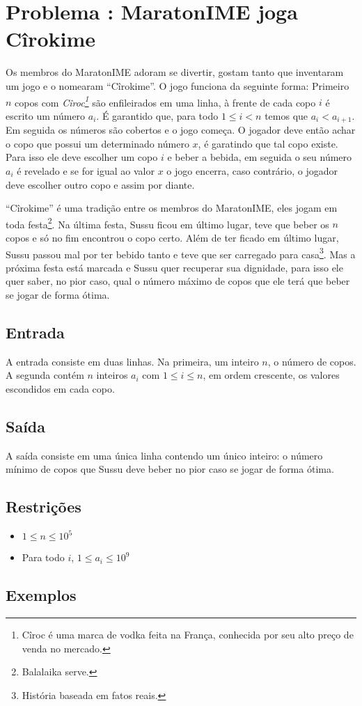 \section*{Problema \proxLetra: MaratonIME joga Cîrokime}

Os membros do MaratonIME adoram se divertir, gostam tanto que inventaram um jogo e o nomearam ``Cîrokime''. O jogo funciona da seguinte forma:\newline 
Primeiro $n$ copos com \textit{Cîroc\footnote{Cîroc é uma marca de vodka feita na França, conhecida por seu alto preço de venda no mercado.}} são enfileirados em uma linha, à frente de cada copo $i$ é escrito um número $a_i$. É garantido que, para todo $ 1 \leq i < n$ temos que $a_i < a_{i + 1}$. Em seguida os números são cobertos e o jogo começa.
O jogador deve então achar o copo que possui um determinado número $x$, é garatindo que tal copo existe. Para isso ele deve escolher um copo $i$ e beber a bebida, em seguida o seu número $a_i$ é revelado e se for igual ao valor $x$ o jogo encerra, caso contrário, o jogador deve escolher outro copo e assim por diante. 

``Cîrokime'' é uma tradição entre os membros do MaratonIME, eles jogam em toda festa\footnote{Balalaika serve.}. Na última festa, Sussu ficou em último lugar, teve que beber os $n$ copos e só no fim encontrou o copo certo. Além de ter ficado em último lugar, Sussu passou mal por ter bebido tanto e teve que ser carregado para casa\footnote{História baseada em fatos reais.}. Mas a próxima festa está marcada e Sussu quer recuperar sua dignidade, para isso ele quer saber, no pior caso, qual o número máximo de copos que ele terá que beber se jogar de forma ótima.

\subsection*{Entrada}

A entrada consiste em duas linhas. Na primeira, um inteiro $n$, o número de copos. A segunda contém $n$ inteiros $a_i$ com $1 \leq i \leq n$, em ordem crescente, os valores escondidos em cada copo.


\subsection*{Saída}

A saída consiste em uma única linha contendo um único inteiro: o número mínimo de copos que Sussu deve beber no pior caso se jogar de forma ótima.


\subsection*{Restrições}
\begin{itemize}
  \item $1 \leq n \leq 10^5$
  \item Para todo $i$, $1 \leq a_i \leq 10^9$
\end{itemize}

\subsection*{Exemplos}

\begin{center}
\end{center}

